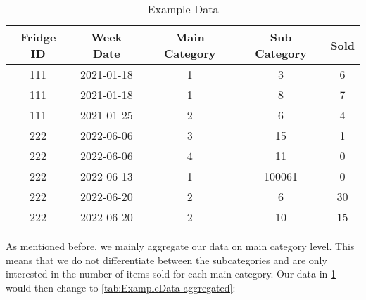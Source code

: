 % 
\begin{table}[h!]
\centering
\begin{tabular}{ccccc}
\hline
\rowcolor[HTML]{FFFFFF} 
\textbf{Fridge ID} & \textbf{Week Date} & \textbf{Main Category} & \textbf{Sub Category} & \textbf{Sold} \\ \hline
111                & 2021-01-18         & 1                      & 3                     & 6             \\
111                & 2021-01-18         & 1                      & 8                     & 7             \\
111                & 2021-01-25         & 2                      & 6                     & 4             \\
222                & 2022-06-06         & 3                      & 15                    & 1             \\
222                & 2022-06-06         & 4                      & 11                    & 0             \\
222                & 2022-06-13         & 1                      & 100061                & 0             \\
222                & 2022-06-20         & 2                      & 6                     & 30            \\
222                & 2022-06-20         & 2                      & 10                    & 15            \\ \hline
\end{tabular}
\caption{Example Data}
\label{tab:ExampleData}
\end{table}

As mentioned before, we mainly aggregate our data on main category level. This means that we do not differentiate between the subcategories and are only interested in the number of items sold for each main category. Our data in \ref{tab:ExampleData} would then change to \ref{tab:ExampleData aggregated}:

